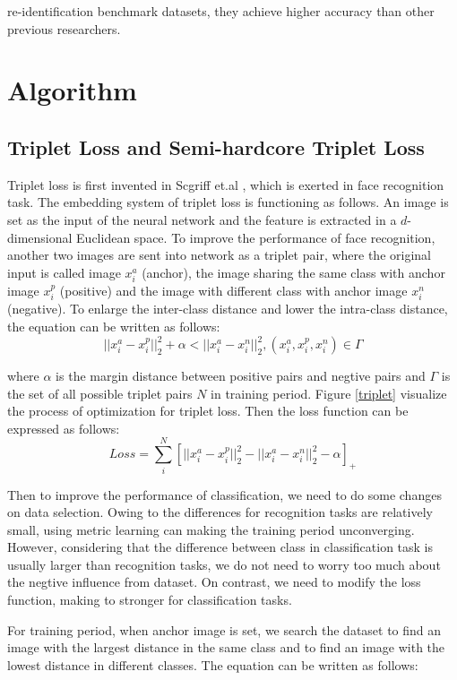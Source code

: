 \documentclass[11pt,onecolumn,letterpaper]{article}
\begin{document}
re-identification benchmark datasets, they achieve higher accuracy than other previous researchers.

\section{Algorithm}
\subsection{Triplet Loss and Semi-hardcore Triplet Loss}
Triplet loss is first invented in Scgriff et.al \cite{schroff2015facenet}, which is exerted in face recognition task. The embedding system of triplet loss is functioning as follows. An image is set as the input of the neural network and the feature is extracted in a $d$-dimensional Euclidean space. To improve the performance of face recognition, another two images are sent into network as a triplet pair, where the original input is called image $x_i^a$ (anchor), the image sharing the same class with anchor image $x_i^p$ (positive) and the image with different class with anchor image $x_i^n$ (negative). To enlarge the inter-class distance and lower the intra-class distance, the equation can be written as follows:
$$||x_i^a - x_i^p||_2^2 + \alpha < ||x_i^a - x_i^n||_2^2, (x_i^a, x_i^p, x_i^n) \in \Gamma$$

where $\alpha$ is the margin distance between positive pairs and negtive pairs and $\Gamma$ is the set of all possible triplet pairs $N$ in training period. Figure \ref{triplet} visualize the process of optimization for triplet loss. Then the loss function can be expressed as follows:
$$Loss = \sum_{i}^N [||x_i^a - x_i^p||_2^2  - ||x_i^a - x_i^n||_2^2 - \alpha]_+$$

Then to improve the performance of classification, we need to do some changes on data selection. Owing to the differences for recognition tasks are relatively small, using metric learning can making the training period unconverging. However,  considering that the difference between class in classification task is usually larger than recognition tasks, we do not need to worry too much about the negtive influence from dataset. On contrast, we need to modify the loss function, making to stronger for classification tasks.

For training period, when anchor image is set, we search the dataset to find an image  with the largest distance in the same class and to find an image with the lowest distance in different classes. The equation can be written as follows:
\end{document}
